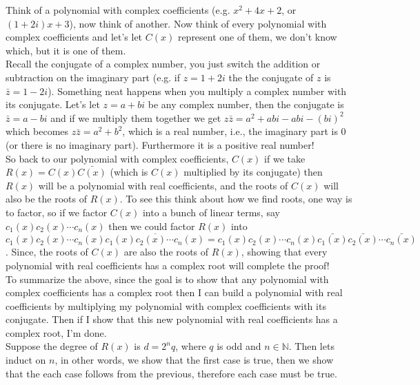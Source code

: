 \documentclass[12pt]{article}
\begin{document}
Think of a polynomial with complex coefficients (e.g. $x^2+4x+2$, or $(1+2i)x+3$), now think of another.  Now think of every polynomial with complex coefficients and let's let $C(x)$ represent one of them, we don't know which, but it is one of them.\\

Recall the conjugate of a complex number, you just switch the addition or subtraction on the imaginary part (e.g. if $z = 1+2i$ the the conjugate of $z$ is $\bar{z} = 1 - 2i$).  Something neat happens when you multiply a complex number with its conjugate. Let's let $z=a+bi$ be any complex number, then the conjugate is $\bar{z}=a-bi$ and if we multiply them together we get $z\bar{z}=a^2+abi-abi-(bi)^2$ which becomes $z\bar{z}=a^2+b^2$, which is a real number, i.e., the imaginary part is 0 (or there is no imaginary part).  Furthermore it is a positive real number!\\

So back to our polynomial with complex coefficients, $C(x)$ if we take $R(x) = C(x) \bar{C(x)}$ (which is $C(x)$ multiplied by its conjugate) then $R(x)$ will be a polynomial with real coefficients, and the roots of $C(x)$ will also be the roots of $R(x)$.  To see this think about how we find roots, one way is to factor, so if we factor $C(x)$ into a bunch of linear terms, say $c_1(x)c_2(x)\cdots c_n(x)$ then we could factor $R(x)$ into $$c_1(x)c_2(x)\cdots c_n(x)\overline{c_1(x)c_2(x) \cdots c_n(x)}= c_1(x)c_2(x)\cdots c_n(x)\bar{c_1(x)} \bar{c_2(x)} \cdots \bar{c_n(x)}$$.  Since, the roots of $C(x)$ are also the roots of $R(x)$, showing that every polynomial with real coefficients has a complex root will complete the proof!\\

To summarize the above, since the goal is to show that any polynomial with complex coefficients has a complex root then I can build a polynomial with real coefficients by multiplying my polynomial with complex coefficients with its conjugate.  Then if I show that this new polynomial with real coefficients has a complex root, I'm done.\\

Suppose the degree of $R(x)$ is $d=2^n q$, where $q$ is odd and $n \in \mathbb{N}$.   
Then lets induct on $n$, in other words, we show that the first case is true, then we show that the each case follows from the previous, therefore each case must be true.
\end{document}
